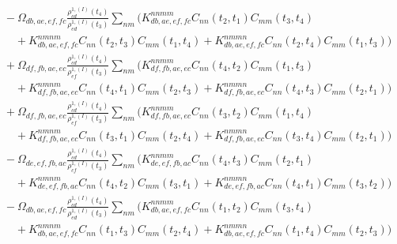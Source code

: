 {{{\begin{equation*}
\begin{aligned}
&\quad \quad \quad - \Omega_{db,ae,ef,fc} \frac{\rho_{ c d }^{1, (I) }(t_4)}{ \rho_{ e d }^{1, (I) }(t_3)} \sum_{nm} \big(K_{db,ae,ef,fc}^{nnmm} C_{nn}(t_2, t_1)C_{mm} (t_3, t_4) \\
&\quad \quad \quad \quad  + K_{db,ae,ef,fc}^{nmnm} C_{nn}(t_2, t_3)C_{mm}(t_1, t_4) + K_{db,ae,ef,fc}^{nmmn} C_{nn}(t_2, t_4)C_{mm}(t_1, t_3) \big)\\ %
&\quad \quad \quad + \Omega_{df,fb,ae,ec} \frac{\rho_{ c d }^{1, (I) }(t_4)}{ \rho_{ e f }^{1, (I) }(t_3)} \sum_{nm} \big(K_{df,fb,ae,ec}^{nnmm} C_{nn}(t_4, t_2)C_{mm} (t_1, t_3) \\
&\quad \quad \quad \quad  + K_{df,fb,ae,ec}^{nmnm} C_{nn}(t_4, t_1)C_{mm}(t_2, t_3) + K_{df,fb,ae,ec}^{nmmn} C_{nn}(t_4, t_3)C_{mm}(t_2, t_1) \big) \\ %
&\quad \quad \quad + \Omega_{df,fb,ae,ec} \frac{\rho_{ c d }^{1, (I) }(t_4)}{ \rho_{ e f }^{1, (I) }(t_3)} \sum_{nm} \big(K_{df,fb,ae,ec}^{nnmm} C_{nn}(t_3, t_2)C_{mm} (t_1, t_4) \\
&\quad \quad \quad \quad  + K_{df,fb,ae,ec}^{nmnm} C_{nn}(t_3, t_1)C_{mm}(t_2, t_4) + K_{df,fb,ae,ec}^{nmmn} C_{nn}(t_3, t_4)C_{mm}(t_2, t_1) \big) \\ %
&\quad \quad \quad - \Omega_{de,ef,fb,ac} \frac{\rho_{ c d }^{1, (I) }(t_4)}{ \rho_{ c f }^{1, (I) }(t_3)} \sum_{nm} \big(K_{de,ef,fb,ac}^{nnmm} C_{nn}(t_4, t_3)C_{mm} (t_2, t_1) \\
&\quad \quad \quad \quad  + K_{de,ef,fb,ac}^{nmnm} C_{nn}(t_4, t_2)C_{mm}(t_3, t_1) + K_{de,ef,fb,ac}^{nmmn} C_{nn}(t_4, t_1)C_{mm}(t_3, t_2) \big) \\ %
    &\quad \quad \quad - \Omega_{db,ae,ef,fc} \frac{\rho_{ c d }^{1, (I) }(t_4)}{ \rho_{ e d }^{1, (I) }(t_3)} \sum_{nm} \big(K_{db,ae,ef,fc}^{nnmm} C_{nn}(t_1, t_2)C_{mm} (t_3, t_4)  \\
&\quad \quad \quad \quad + K_{db,ae,ef,fc}^{nmnm} C_{nn}(t_1, t_3)C_{mm}(t_2, t_4) + K_{db,ae,ef,fc}^{nmmn} C_{nn}(t_1, t_4)C_{mm}(t_2, t_3) \big)  \\ %

    \end{aligned}
\end{equation*}
}}}


